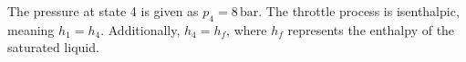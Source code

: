 The pressure at state 4 is given as \( p_4 = 8 \, \text{bar} \).  
The throttle process is isenthalpic, meaning \( h_1 = h_4 \).  
Additionally, \( h_4 = h_f \), where \( h_f \) represents the enthalpy of the saturated liquid.